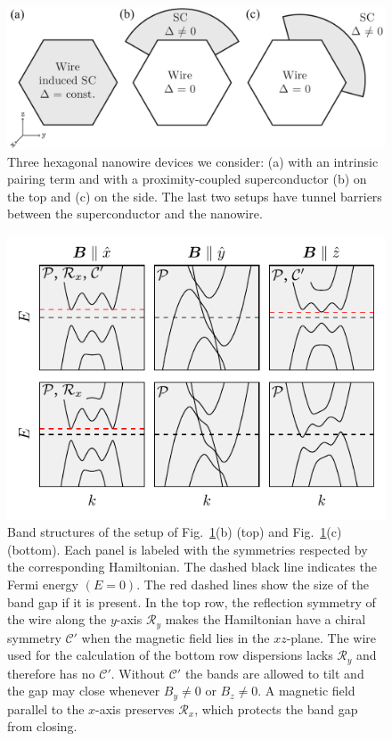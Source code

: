 \begin{figure}
\begin{center}
\includegraphics[width=0.7\columnwidth]{chapter_orbitalfield/figures/geometry}
\caption{Three hexagonal nanowire devices we consider: (a) with an intrinsic pairing term and with a proximity-coupled superconductor (b) on the top and (c) on the side.
The last two setups have tunnel barriers between the superconductor and the nanowire.
\label{fig:geometry}}
\end{center}
\end{figure}

\begin{figure}
\begin{center}
\includegraphics[width=0.7\columnwidth]{chapter_orbitalfield/figures/bandstructure_annotated}
\caption{Band structures of the setup of Fig.~\ref{fig:geometry}(b) (top) and Fig.~\ref{fig:geometry}(c) (bottom).
Each panel is labeled with the symmetries respected by the corresponding Hamiltonian.
The dashed black line indicates the Fermi energy $(E=0)$.
The red dashed lines show the size of the band gap if it is present.
In the top row, the reflection symmetry of the wire along the $y$-axis $\mathcal{R}_y$ makes the Hamiltonian have a chiral symmetry $\mathcal{C}'$ when the magnetic field lies in the $xz$-plane.
The wire used for the calculation of the bottom row dispersions lacks $\mathcal{R}_y$ and therefore has no $\mathcal{C}'$.
Without $\mathcal{C}'$ the bands are allowed to tilt and the gap may close whenever $B_y \neq 0$ or $B_z \neq 0$.
A magnetic field parallel to the $x$-axis preserves $\mathcal{R}_x$, which protects the band gap from closing.\label{fig:bandstructure}}
\end{center}
\end{figure}

